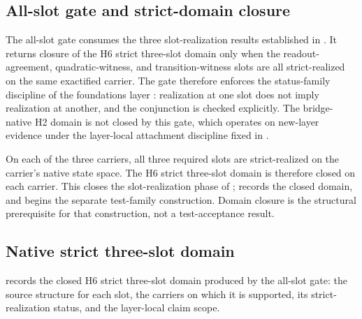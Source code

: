 \documentclass[11pt]{article}
\newcommand{\OldLayer}{H2}
\newcommand{\NewLayer}{H6}
\theoremstyle{definition}
\begin{document}
\subsection{All-slot gate and strict-domain closure}\label{subsec:all-slot-gate-and-strict-domain-closure}

The all-slot gate consumes the three slot-realization results established in
.
It returns closure of the \NewLayer{} strict three-slot domain only when the
readout-agreement, quadratic-witness, and transition-witness slots are all
strict-realized on the same exactified carrier.  The gate therefore enforces
the status-family discipline of the foundations layer
\cite{Tsiokos2026FoundationsII}: realization at one slot does not imply
realization at another, and the conjunction is checked explicitly.  The
bridge-native \OldLayer{} domain is not closed by this gate, which operates on
new-layer evidence under the layer-local attachment discipline fixed in
.

On each of the three carriers, all three required slots are strict-realized on
the carrier's native state space.  The \NewLayer{} strict three-slot domain is
therefore closed on each carrier.  This closes the slot-realization phase of
;  records
the closed domain, and  begins the
separate test-family construction.  Domain closure is the structural
prerequisite for that construction, not a test-acceptance result.

\subsection{Native strict three-slot domain}\label{subsec:native-strict-domain-table}

 records the closed \NewLayer{} strict
three-slot domain produced by the all-slot gate: the source structure for each
slot, the carriers on which it is supported, its strict-realization status, and
the layer-local claim scope.
\end{document}
